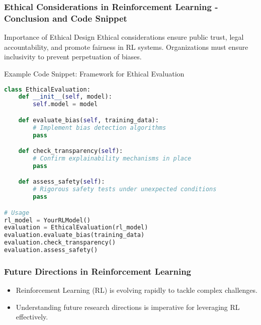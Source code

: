\documentclass[aspectratio=169]{beamer}
\begin{document}
\begin{frame}[fragile]
    \frametitle{Ethical Considerations in Reinforcement Learning - Conclusion and Code Snippet}
    \begin{block}{Importance of Ethical Design}
        Ethical considerations ensure public trust, legal accountability, and promote fairness in RL systems. 
        Organizations must ensure inclusivity to prevent perpetuation of biases.
    \end{block}

    \begin{block}{Example Code Snippet: Framework for Ethical Evaluation}
    \begin{lstlisting}[language=Python]
class EthicalEvaluation:
    def __init__(self, model):
        self.model = model

    def evaluate_bias(self, training_data):
        # Implement bias detection algorithms
        pass

    def check_transparency(self):
        # Confirm explainability mechanisms in place
        pass

    def assess_safety(self):
        # Rigorous safety tests under unexpected conditions
        pass

# Usage
rl_model = YourRLModel()
evaluation = EthicalEvaluation(rl_model)
evaluation.evaluate_bias(training_data)
evaluation.check_transparency()
evaluation.assess_safety()
    \end{lstlisting}
    \end{block}
\end{frame}

\begin{frame}[fragile]
    \frametitle{Future Directions in Reinforcement Learning}
    \begin{itemize}
        \item Reinforcement Learning (RL) is evolving rapidly to tackle complex challenges.
        \item Understanding future research directions is imperative for leveraging RL effectively.
    \end{itemize}
\end{frame}
\end{document}
